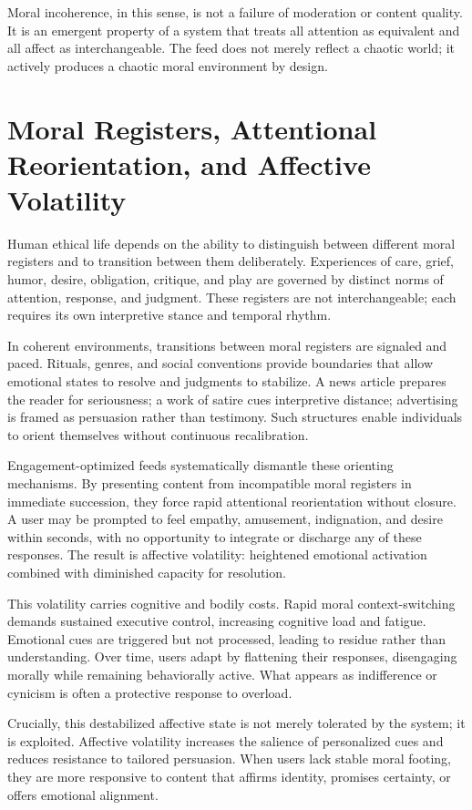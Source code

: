 \documentclass[12pt]{article}
\begin{document}
Moral incoherence, in this sense, is not a failure of moderation or content quality. It is an emergent property of a system that treats all attention as equivalent and all affect as interchangeable. The feed does not merely reflect a chaotic world; it actively produces a chaotic moral environment by design.

\section{Moral Registers, Attentional Reorientation, and Affective Volatility}

Human ethical life depends on the ability to distinguish between different moral registers and to transition between them deliberately. Experiences of care, grief, humor, desire, obligation, critique, and play are governed by distinct norms of attention, response, and judgment. These registers are not interchangeable; each requires its own interpretive stance and temporal rhythm.

In coherent environments, transitions between moral registers are signaled and paced. Rituals, genres, and social conventions provide boundaries that allow emotional states to resolve and judgments to stabilize. A news article prepares the reader for seriousness; a work of satire cues interpretive distance; advertising is framed as persuasion rather than testimony. Such structures enable individuals to orient themselves without continuous recalibration.

Engagement-optimized feeds systematically dismantle these orienting mechanisms. By presenting content from incompatible moral registers in immediate succession, they force rapid attentional reorientation without closure. A user may be prompted to feel empathy, amusement, indignation, and desire within seconds, with no opportunity to integrate or discharge any of these responses. The result is affective volatility: heightened emotional activation combined with diminished capacity for resolution.

This volatility carries cognitive and bodily costs. Rapid moral context-switching demands sustained executive control, increasing cognitive load and fatigue. Emotional cues are triggered but not processed, leading to residue rather than understanding. Over time, users adapt by flattening their responses, disengaging morally while remaining behaviorally active. What appears as indifference or cynicism is often a protective response to overload.

Crucially, this destabilized affective state is not merely tolerated by the system; it is exploited. Affective volatility increases the salience of personalized cues and reduces resistance to tailored persuasion. When users lack stable moral footing, they are more responsive to content that affirms identity, promises certainty, or offers emotional alignment.
\end{document}
